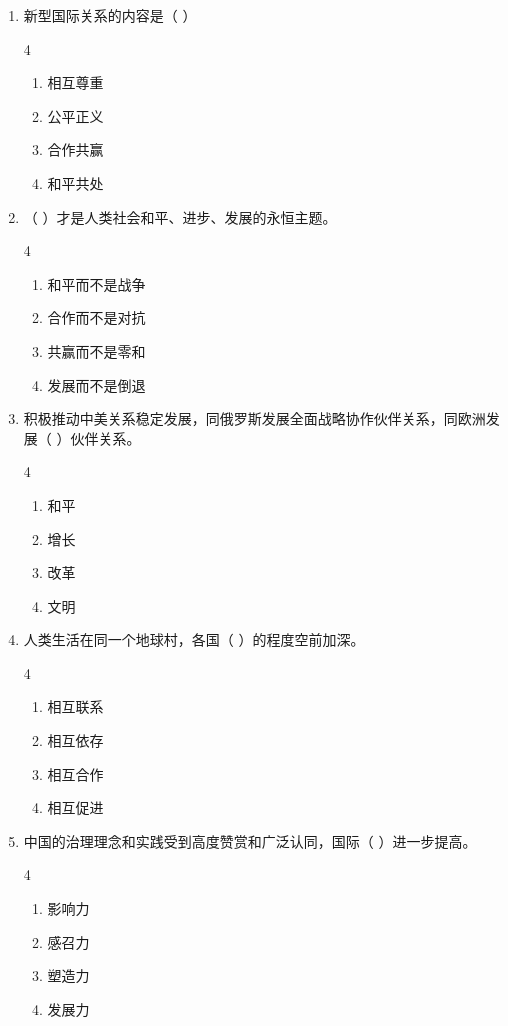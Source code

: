 \documentclass[a4paper,11pt]{ctexart}
\begin{document}
\begin{enumerate}
    \item 新型国际关系的内容是（ ）
    \begin{multicols}{4}
    \begin{enumerate}
        \item 相互尊重
        \item 公平正义
        \item 合作共赢
        \item 和平共处
    \end{enumerate}
    \end{multicols}

    \item （ ）才是人类社会和平、进步、发展的永恒主题。
    \begin{multicols}{4}
    \begin{enumerate}
        \item 和平而不是战争
        \item 合作而不是对抗
        \item 共赢而不是零和
        \item 发展而不是倒退
    \end{enumerate}
    \end{multicols}

    \item 积极推动中美关系稳定发展，同俄罗斯发展全面战略协作伙伴关系，同欧洲发展（ ）伙伴关系。
    \begin{multicols}{4}
    \begin{enumerate}
        \item 和平
        \item 增长
        \item 改革
        \item 文明
    \end{enumerate}
    \end{multicols}

    \item 人类生活在同一个地球村，各国（ ）的程度空前加深。
    \begin{multicols}{4}
    \begin{enumerate}
        \item 相互联系
        \item 相互依存
        \item 相互合作
        \item 相互促进
    \end{enumerate}
    \end{multicols}

    \item 中国的治理理念和实践受到高度赞赏和广泛认同，国际（ ）进一步提高。
    \begin{multicols}{4}
    \begin{enumerate}
        \item 影响力
        \item 感召力
        \item 塑造力
        \item 发展力
    \end{enumerate}
    \end{multicols}


\end{enumerate}
\end{document}
